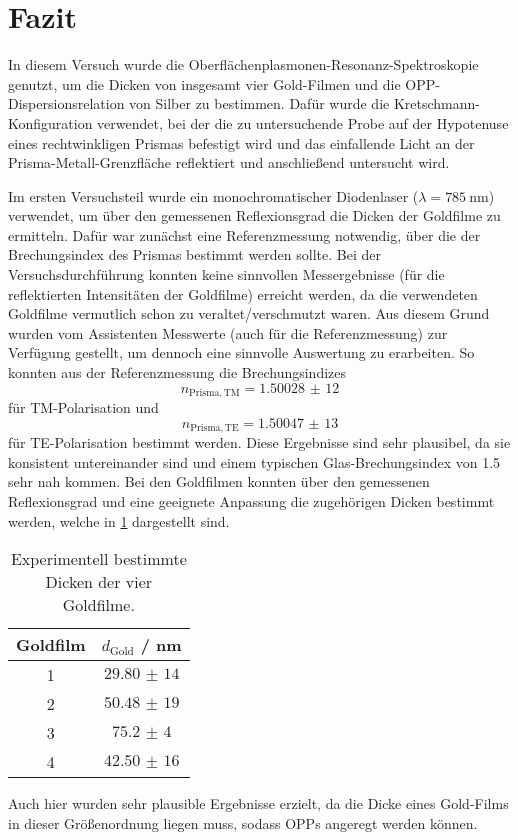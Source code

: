 \section{Fazit}\label{sec:fazit}
In diesem Versuch wurde die Oberflächenplasmonen-Resonanz-Spektroskopie genutzt, um die Dicken von insgesamt vier Gold-Filmen und
die OPP-Dispersionsrelation von Silber zu bestimmen. Dafür wurde die Kretschmann-Konfiguration verwendet, bei der die zu untersuchende
Probe auf der Hypotenuse eines rechtwinkligen Prismas befestigt wird und das einfallende Licht an der Prisma-Metall-Grenzfläche reflektiert
und anschließend untersucht wird.\par
Im ersten Versuchsteil wurde ein monochromatischer Diodenlaser ($\lambda = \SI{785}{\nm}$) verwendet, um über den gemessenen Reflexionsgrad
die Dicken der Goldfilme zu ermitteln. Dafür war zunächst eine Referenzmessung notwendig, über die der Brechungsindex
des Prismas bestimmt werden sollte. Bei der Versuchsdurchführung konnten keine sinnvollen Messergebnisse (für die reflektierten Intensitäten der
Goldfilme) erreicht werden, da die verwendeten Goldfilme vermutlich schon zu veraltet/verschmutzt waren. Aus diesem Grund wurden vom Assistenten
Messwerte (auch für die Referenzmessung) zur Verfügung gestellt, um dennoch eine sinnvolle Auswertung zu erarbeiten. So konnten aus der Referenzmessung
die Brechungsindizes
\begin{equation*}
    n_{\mathrm{Prisma,TM}} = \num{1,50028(12)}
\end{equation*} für TM-Polarisation und
\begin{equation*}
    n_{\mathrm{Prisma,TE}} = \num{1,50047(13)}
\end{equation*} für TE-Polarisation bestimmt werden. Diese Ergebnisse sind sehr plausibel, da sie konsistent untereinander sind und einem typischen Glas-Brechungsindex
von \num{1,5} sehr nah kommen. Bei den Goldfilmen konnten über den gemessenen Reflexionsgrad und eine geeignete Anpassung die zugehörigen Dicken bestimmt werden,
welche in \cref{tab:gold_fazit} dargestellt sind.
\begin{table}[H]
    \centering
    \caption{Experimentell bestimmte Dicken der vier Goldfilme.}
    \begin{tabular}{c|c}
        Goldfilm & $d_{\mathrm{Gold}}$ / \unit{\nm} \\
        \hline
        1 & $\num{29,80(14)}$ \\
        2 & $\num{50,48(19)}$ \\
        3 & $\num{75,2(4)}$ \\
        4 & $\num{42,50(16)}$               
    \end{tabular}\label{tab:gold_fazit}
\end{table} Auch hier wurden sehr plausible Ergebnisse erzielt, da die Dicke eines Gold-Films in dieser Größenordnung liegen muss, sodass OPPs angeregt werden können.
